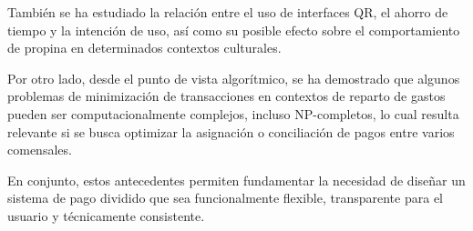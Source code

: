 \documentclass[12pt]{report}
\begin{document}
También se ha estudiado la relación entre el uso de interfaces QR, el ahorro de tiempo y la intención de uso, así como su posible efecto sobre el comportamiento de propina en determinados contextos culturales. \cite{parvez2025qr}

Por otro lado, desde el punto de vista algorítmico, se ha demostrado que algunos problemas de minimización de transacciones en contextos de reparto de gastos pueden ser computacionalmente complejos, incluso NP-completos, lo cual resulta relevante si se busca optimizar la asignación o conciliación de pagos entre varios comensales. \cite{bultel2020splitwise}

En conjunto, estos antecedentes permiten fundamentar la necesidad de diseñar un sistema de pago dividido que sea funcionalmente flexible, transparente para el usuario y técnicamente consistente.
\end{document}
